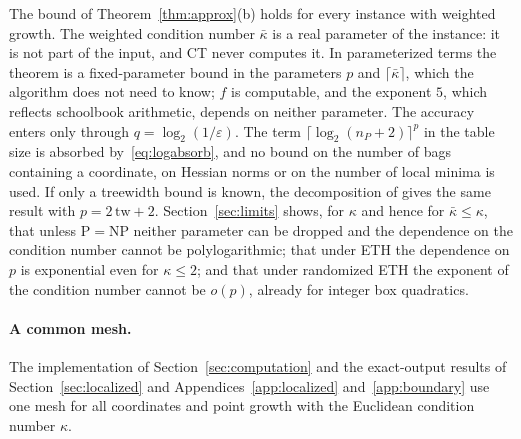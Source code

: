 \begin{remark}\label{rem:fpt}
The bound of Theorem~\ref{thm:approx}(b) holds for every instance with
weighted growth. The weighted condition number $\bar\kappa$ is a real
parameter of the instance: it is not part of the input, and CT never
computes it. In parameterized terms the theorem is a fixed-parameter bound
in the parameters $p$ and $\lceil\bar\kappa\rceil$, which the algorithm does
not need to know; $f$ is computable, and the exponent $5$, which reflects
schoolbook arithmetic, depends on neither parameter. The accuracy enters
only through $q=\log_2(1/\varepsilon)$. The term
$\lceil\log_2(n_P+2)\rceil^p$ in the table size is absorbed
by~\eqref{eq:logabsorb}, and no bound on the number of bags containing a
coordinate, on Hessian norms or on the number of local minima is used. If
only a treewidth bound is known, the decomposition of \cite{Korhonen2021}
gives the same result with $p=2\,\mathrm{tw}+2$. Section~\ref{sec:limits}
shows, for $\kappa$ and hence for $\bar\kappa\le\kappa$, that unless
P${}={}$NP neither parameter can be dropped and the dependence on the
condition number cannot be polylogarithmic; that under ETH the dependence on
$p$ is exponential even for $\kappa\le2$; and that under randomized ETH the
exponent of the condition number cannot be $o(p)$, already for integer box
quadratics.
\end{remark}

\paragraph{A common mesh.}
The implementation of Section~\ref{sec:computation} and the exact-output
results of Section~\ref{sec:localized} and
Appendices~\ref{app:localized} and~\ref{app:boundary} use one mesh for all
coordinates and point growth with the Euclidean condition number $\kappa$.

